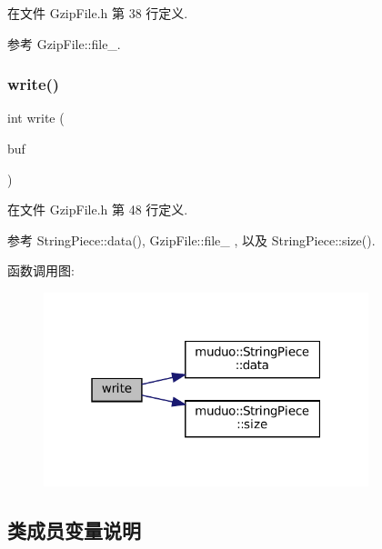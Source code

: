 在文件 Gzip\+File.\+h 第 38 行定义.



参考 Gzip\+File\+::file\+\_\+.

\mbox{\label{classmuduo_1_1GzipFile_a9df1dd3bba47672243cc91713d8a59dd}} 
\subsubsection{\texorpdfstring{write()}{write()}}
{\footnotesize\ttfamily int write (\begin{DoxyParamCaption}\item[{\hyperlink{classmuduo_1_1StringPiece}{String\+Piece}}]{buf }\end{DoxyParamCaption})\hspace{0.3cm}{\ttfamily [inline]}}



在文件 Gzip\+File.\+h 第 48 行定义.



参考 String\+Piece\+::data(), Gzip\+File\+::file\+\_\+ , 以及 String\+Piece\+::size().

函数调用图\+:
\nopagebreak
\begin{figure}[H]
\begin{center}
\leavevmode
\includegraphics[width=268pt]{classmuduo_1_1GzipFile_a9df1dd3bba47672243cc91713d8a59dd_cgraph}
\end{center}
\end{figure}


\subsection{类成员变量说明}
\mbox{\label{classmuduo_1_1GzipFile_aefa49b1eaa84765dc4afdffadb3a117d}} 
